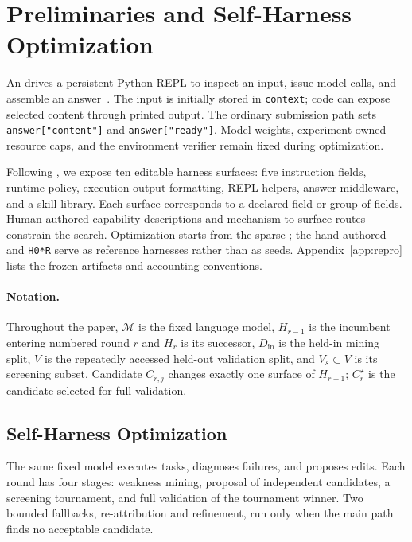 \section{Preliminaries and Self-Harness Optimization}
\label{sec:method}

An \rlm{} drives a persistent Python REPL to inspect an input, issue model calls,
and assemble an answer~\citep{zhang2025rlm}. The input is initially stored in
\texttt{context}; code can expose selected content through printed output. The
ordinary submission path sets \texttt{answer["content"]} and
\texttt{answer["ready"]}. Model weights, experiment-owned resource caps, and
the environment verifier remain fixed during optimization.

Following \citet{zhang2026selfharness}, we expose ten editable harness surfaces:
five instruction fields, runtime policy, execution-output formatting, REPL
helpers, answer middleware, and a skill library. Each surface corresponds to a
declared field or group of fields. Human-authored capability descriptions and
mechanism-to-surface routes constrain the search. Optimization starts from the
sparse \hzero{}; the hand-authored \hzerostar{} and \texttt{H0*R} serve as
reference harnesses rather than as seeds. Appendix~\ref{app:repro}
lists the frozen artifacts and accounting conventions.

\paragraph{Notation.}
Throughout the paper, $\mathcal{M}$ is the fixed language model, $H_{r-1}$ is
the incumbent entering numbered round $r$ and $H_r$ is its successor,
$D_{\mathrm{in}}$ is the held-in mining split,
$V$ is the repeatedly accessed held-out validation split, and $V_s\subset V$
is its screening subset. Candidate $C_{r,j}$ changes exactly one surface of
$H_{r-1}$; $C_r^\star$ is the candidate selected for full validation.


\subsection{Self-Harness Optimization}
\label{sec:sho}

The same fixed model executes tasks, diagnoses failures, and proposes edits.
Each round has four stages: weakness mining,
proposal of independent candidates, a screening tournament, and full validation
of the tournament winner. Two bounded fallbacks, re-attribution and
refinement, run only when the main path finds no acceptable candidate.

